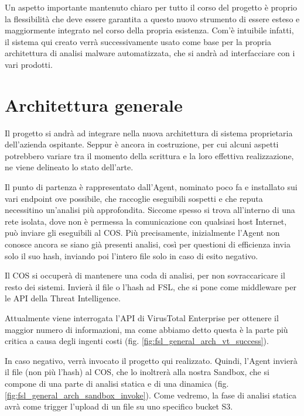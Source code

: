 Un aspetto importante mantenuto chiaro per tutto il corso del progetto è proprio la flessibilità che deve essere garantita a questo nuovo strumento di essere esteso e maggiormente integrato nel corso della propria esistenza. Com'è intuibile infatti, il sistema qui creato verrà successivamente usato come base per la propria architettura di analisi malware automatizzata, che si andrà ad interfacciare con i vari prodotti.

\section{Architettura generale}
\label{chap:intro_interface_with_other_services}

Il progetto si andrà ad integrare nella nuova architettura di sistema proprietaria dell'azienda ospitante.
Seppur è ancora in costruzione, per cui alcuni aspetti potrebbero variare tra il momento della scrittura e la loro effettiva realizzazione, ne viene delineato lo stato dell'arte.

Il punto di partenza è rappresentato dall'Agent, nominato poco fa e installato sui vari endpoint ove possibile, che raccoglie eseguibili sospetti e che reputa necessitino un'analisi più approfondita.
Siccome spesso si trova all'interno di una rete isolata, dove non è permessa la comunicazione con qualsiasi host Internet, può inviare gli eseguibili al COS. Più precisamente, inizialmente l'Agent non conosce ancora se siano già presenti analisi, così per questioni di efficienza invia solo il suo hash, inviando poi l'intero file solo in caso di esito negativo.

Il COS si occuperà di mantenere una coda di analisi, per non sovraccaricare il resto dei sistemi.
Invierà il file o l'hash ad FSL, che si pone come middleware per le API della Threat Intelligence.

Attualmente viene interrogata l'API di VirusTotal Enterprise per ottenere il maggior numero di informazioni, ma come abbiamo detto questa è la parte più critica a causa degli ingenti costi (fig. \ref{fig:fsl_general_arch_vt_success}).

In caso negativo, verrà invocato il progetto qui realizzato. Quindi, l'Agent invierà il file (non più l'hash) al COS, che lo inoltrerà alla nostra Sandbox, che si compone di una parte di analisi statica e di una dinamica (fig. \ref{fig:fsl_general_arch_sandbox_invoke}). Come vedremo, la fase di analisi statica avrà come trigger l'upload di un file su uno specifico bucket S3.

